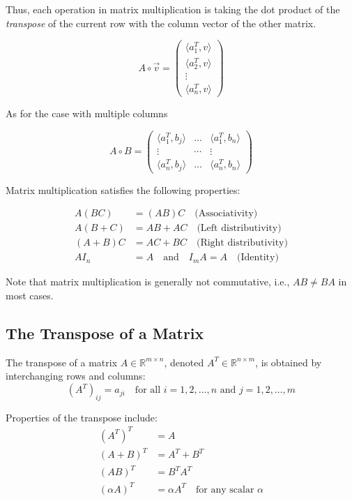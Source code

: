 Thus, each operation in matrix multiplication is taking the dot product of the \emph{transpose} 
of the current row with the column vector of the other matrix.

\[
A \circ \vec{v} = 
\begin{pmatrix}
\langle a_{1}^T, v\rangle \\
\langle a_{2}^T, v\rangle \\
\vdots \\
\langle a_{n}^T, v\rangle 
\end{pmatrix}
\]

As for the case with multiple columns

\[
A \circ B = 
\begin{pmatrix}
\langle a_{1}^T, b_{j} \rangle & \dots  & \langle a_{1}^T, b_{n} \rangle \\
\vdots                         & \cdots &              \vdots            \\
\langle a_{n}^T, b_{j} \rangle & \dots  & \langle a_{n}^T, b_{n} \rangle 
\end{pmatrix}
\]

Matrix multiplication satisfies the following properties:

\begin{align*}
A(BC) &= (AB)C \quad \text{(Associativity)} \\
A(B+C) &= AB + AC \quad \text{(Left distributivity)} \\
(A+B)C &= AC + BC \quad \text{(Right distributivity)} \\
AI_n &= A \quad \text{and} \quad I_m A = A \quad \text{(Identity)}
\end{align*}

Note that matrix multiplication is generally not commutative, i.e., \(AB \neq BA\) in most cases.

\subsection{The Transpose of a Matrix}

The transpose of a matrix \(A \in \mathbb{R}^{m \times n}\), denoted \(A^T \in \mathbb{R}^{n \times m}\), is obtained by interchanging rows and columns:
\begin{equation*}
{(A^T)}_{ij} = a_{ji} \quad \text{for all } i = 1, 2, \ldots, n \text{ and } j = 1, 2, \ldots, m
\end{equation*}

Properties of the transpose include:
\begin{align*}
{(A^T)}^T &= A \\
{(A + B)}^T &= A^T + B^T \\
{(AB)}^T &= B^T A^T \\
{(\alpha A)}^T &= \alpha A^T \quad \text{for any scalar } \alpha
\end{align*}


